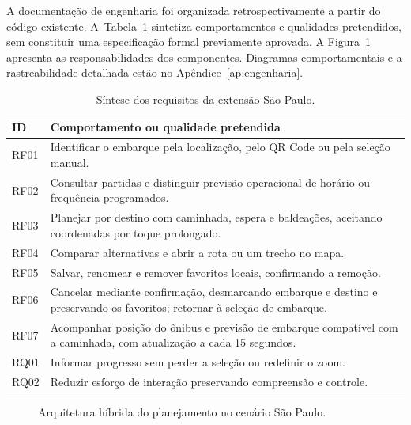 A documentação de engenharia foi organizada retrospectivamente a partir do código existente. A~Tabela~\ref{tab:requisitos-pap} sintetiza comportamentos e qualidades pretendidos, sem constituir uma especificação formal previamente aprovada. A Figura~\ref{fig:arquitetura-pap} apresenta as responsabilidades dos componentes. Diagramas comportamentais e a rastreabilidade detalhada estão no Apêndice~\ref{ap:engenharia}.
\begin{table}[H]\centering\small
\caption{Síntese dos requisitos da extensão São Paulo.}\label{tab:requisitos-pap}
\begin{tabular}{p{1.5cm}p{11.5cm}}\hline
ID & Comportamento ou qualidade pretendida\\\hline
RF01 & Identificar o embarque pela localização, pelo QR Code ou pela seleção manual.\\
RF02 & Consultar partidas e distinguir previsão operacional de horário ou frequência programados.\\
RF03 & Planejar por destino com caminhada, espera e baldeações, aceitando coordenadas por toque prolongado.\\
RF04 & Comparar alternativas e abrir a rota ou um trecho no mapa.\\
RF05 & Salvar, renomear e remover favoritos locais, confirmando a remoção.\\
RF06 & Cancelar mediante confirmação, desmarcando embarque e destino e preservando os favoritos; retornar à seleção de embarque.\\
RF07 & Acompanhar posição do ônibus e previsão de embarque compatível com a caminhada, com atualização a cada 15 segundos.\\
RQ01 & Informar progresso sem perder a seleção ou redefinir o zoom.\\
RQ02 & Reduzir esforço de interação preservando compreensão e controle.\\\hline
\end{tabular}
\end{table}

\begin{figure}[H]
\centering\resizebox{\textwidth}{!}{}
\caption{Arquitetura híbrida do planejamento no cenário São Paulo.}\label{fig:arquitetura-pap}
\end{figure}


